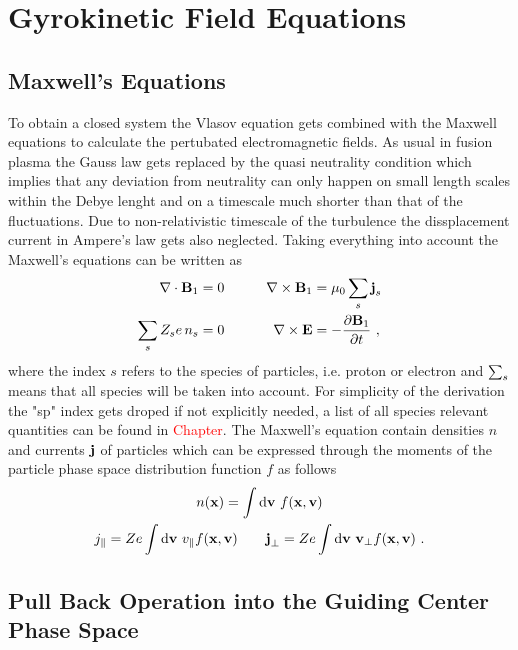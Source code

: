 \newpage
\section{Gyrokinetic Field Equations}
\label{sec:fields}

\subsection{Maxwell's Equations}
\label{sub:maxwellEquations}

To obtain a closed system the Vlasov equation gets combined with the Maxwell equations to calculate the pertubated electromagnetic fields. As usual in fusion plasma the Gauss law gets replaced by the quasi neutrality condition which implies that any deviation from neutrality can only happen on small length scales within the Debye lenght and on a timescale much shorter than that of the fluctuations. Due to non-relativistic timescale of the turbulence the dissplacement current in Ampere's law gets also neglected. Taking everything into account the Maxwell's equations can be written as
\begin{gather}
	\begin{aligned}
		\nabla \cdot \boldsymbol{\mathbf{B}}_1 &= 0 &\qquad \nabla \times \boldsymbol{\mathbf{B}}_1 &= \mu_0 \sum_s \boldsymbol{\mathbf{j}}_s \\
		\sum_s Z_s e \, n_s &= 0  &\qquad \nabla \times \boldsymbol{\mathbf{E}} &= - \frac{\partial \boldsymbol{\mathbf{B}}_1}{\partial t}~,
	\end{aligned}
	\label{eq:maxwellEquations}
\end{gather}
where the index $s$ refers to the species of particles, i.e. proton or electron and $\sum_s$ means that all species will be taken into account. For simplicity of the derivation the "sp" index gets droped if not explicitly needed, a list of all species relevant quantities can be found in \textcolor{red}{Chapter}. The Maxwell's equation contain densities $n$ and currents $\boldsymbol{\mathbf{j}}$ of particles which can be expressed through the moments of the particle phase space distribution function $f$ as follows
\begin{gather}
	n(\boldsymbol{\mathbf{x}}) = \int \mathrm{d}\boldsymbol{\mathbf{v}} ~ f(\boldsymbol{\mathbf{x}}, \boldsymbol{\mathbf{v}}) \\
	j_\parallel = Ze \int \mathrm{d}\boldsymbol{\mathbf{v}} ~ v_\parallel f(\boldsymbol{\mathbf{x}}, \boldsymbol{\mathbf{v}}) \qquad \boldsymbol{\mathbf{j}}_\perp = Ze \int \mathrm{d}\boldsymbol{\mathbf{v}} ~ \boldsymbol{\mathbf{v}}_\perp f(\boldsymbol{\mathbf{x}}, \boldsymbol{\mathbf{v}})~.
	\label{eq:momentsParticleSpace}
\end{gather}
\newpage

\subsection{Pull Back Operation into the Guiding Center Phase Space}
\label{sub:pullback}

